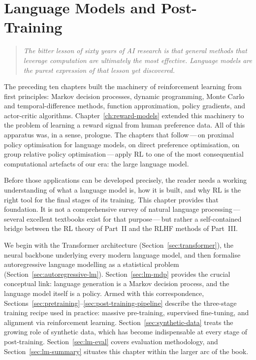 \chapter[Language Models and Post-Training]{Language Models and Post-Training}
\label{ch:lm-post-training}

\begin{quote}
\itshape
The bitter lesson of sixty years of AI research is that general methods that leverage computation are ultimately the most effective. Language models are the purest expression of that lesson yet discovered.
\end{quote}

\bigskip

The preceding ten chapters built the machinery of reinforcement learning from first principles: Markov decision processes, dynamic programming, Monte Carlo and temporal-difference methods, function approximation, policy gradients, and actor-critic algorithms. Chapter~\ref{ch:reward-models} extended this machinery to the problem of learning a reward signal from human preference data. All of this apparatus was, in a sense, prologue. The chapters that follow\,---\,on proximal policy optimisation for language models, on direct preference optimisation, on group relative policy optimisation\,---\,apply RL to one of the most consequential computational artefacts of our era: the large language model.

Before those applications can be developed precisely, the reader needs a working understanding of what a language model is, how it is built, and why RL is the right tool for the final stages of its training. This chapter provides that foundation. It is not a comprehensive survey of natural language processing\,---\,several excellent textbooks exist for that purpose\,---\,but rather a self-contained bridge between the RL theory of Part~II and the RLHF methods of Part~III.

We begin with the Transformer architecture (Section~\ref{sec:transformer}), the neural backbone underlying every modern language model, and then formalise autoregressive language modelling as a statistical problem (Section~\ref{sec:autoregressive-lm}). Section~\ref{sec:lm-mdp} provides the crucial conceptual link: language generation is a Markov decision process, and the language model itself is a policy. Armed with this correspondence, Sections~\ref{sec:pretraining}--\ref{sec:post-training-pipeline} describe the three-stage training recipe used in practice: massive pre-training, supervised fine-tuning, and alignment via reinforcement learning. Section~\ref{sec:synthetic-data} treats the growing role of synthetic data, which has become indispensable at every stage of post-training. Section~\ref{sec:lm-eval} covers evaluation methodology, and Section~\ref{sec:lm-summary} situates this chapter within the larger arc of the book.

